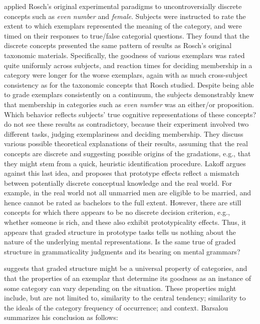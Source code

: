 \citet{ArmstrongEtAl1983} applied Rosch's original experimental paradigms to uncontroversially discrete concepts such as \textit{even number} and \textit{female}. Subjects were instructed to rate the extent to which exemplars
represented the meaning of the category, and were timed on their responses to true/false categorial questions. They found that the discrete concepts presented the same pattern of results as Rosch's original taxonomic materials. Specifically, the goodness of various exemplars was rated quite uniformly across subjects, and reaction times for deciding membership in a category were longer for the worse exemplars, again with as much cross-subject consistency as for the taxonomic concepts that Rosch studied. Despite being able to grade exemplars consistently on a continuum, the subjects demonstrably knew that membership in categories such as \textit{even number} was an either/or proposition. Which behavior reflects subjects' true cognitive representations of these concepts? \citeauthor{ArmstrongEtAl1983}  do not see these results as contradictory, because their experiment involved two different tasks, judging exemplariness and deciding membership. They discuss various possible theoretical explanations of their results, assuming that the real concepts are discrete and suggesting possible origins of the gradations, e.g., that they might stem from a quick, heuristic identification procedure. Lakoff argues against this last idea, and proposes that prototype effects reflect a mismatch between potentially discrete conceptual knowledge and the real world. For example, in the real world not all unmarried men are eligible to be married, and hence cannot be rated as bachelors to the full extent. However, there are still concepts for which there appears to be no discrete decision criterion, e.g., whether someone is rich, and these also exhibit prototypicality effects. Thus, it appears that graded structure in prototype tasks tells us nothing about the nature of the underlying mental representations. Is the same true of graded structure in grammaticality judgments and its bearing on mental grammars?

\citet{Barsalou1987} suggests that graded structure might be a universal property of categories, and that the properties of an exemplar that determine its goodness as an instance of some category can vary depending on the situation. These properties might include, but are not limited to, similarity to the central tendency; similarity to the ideals of the category frequency of occurrence; and context. Barsalou summarizes his conclusion as follows:

